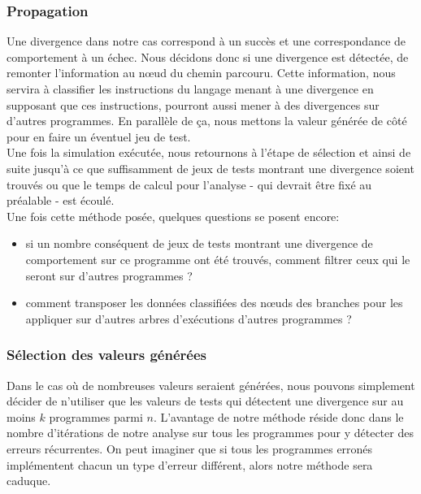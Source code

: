 \subsubsection*{Propagation}
Une divergence dans notre cas correspond à un succès et une correspondance de comportement à un échec. Nous décidons donc si une divergence est détectée, de remonter l'information  au nœud du chemin parcouru. Cette information, nous servira à classifier les instructions du langage menant à une divergence en supposant que ces instructions, pourront aussi mener à des divergences sur d'autres programmes. En parallèle de ça, nous mettons la valeur générée de côté pour en faire un éventuel jeu de test.\\

Une fois la simulation exécutée, nous retournons à l'étape de sélection et ainsi de suite jusqu'à ce que suffisamment de jeux de tests montrant une divergence soient trouvés ou que le temps de calcul pour l'analyse - qui devrait être fixé au préalable - est écoulé.\\

Une fois cette méthode posée, quelques questions se posent encore:
\begin{itemize}
\item si un nombre conséquent de jeux de tests montrant une divergence de comportement sur ce programme ont été trouvés, comment filtrer ceux qui le seront sur d'autres programmes ?
\item comment transposer les données classifiées des nœuds des branches pour les appliquer sur d'autres arbres d'exécutions d'autres programmes ?
\end{itemize}

\subsubsection*{Sélection des valeurs générées}
Dans le cas où de nombreuses valeurs seraient générées, nous pouvons simplement décider de n'utiliser que les valeurs de tests qui détectent une divergence sur au moins $k$ programmes parmi $n$. L'avantage de notre méthode réside donc dans le nombre d'itérations de notre analyse sur tous les programmes pour y détecter des erreurs récurrentes. On peut imaginer que si tous les programmes erronés implémentent chacun un type d'erreur différent, alors notre méthode sera caduque.

